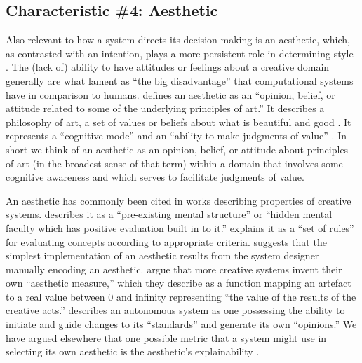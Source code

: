 \documentclass[phd,electronic,oneside,twosidetoc,letterpaper,chaptercenter,parttop,lof,lot]{byumsphd}
\begin{document}
\subsection{Characteristic \#4: Aesthetic}

Also relevant to how a system directs its decision-making is an aesthetic, which, as contrasted with an intention, plays a more persistent role in determining style \citep{Koren2010WhichDefinitions}. The (lack of) ability to have attitudes or feelings about a creative domain generally are what \citeauthor{Papadopoulos1999} \cite{Papadopoulos1999} lament as ``the big disadvantage'' that computational systems have in comparison to humans. \cite{Koren2010WhichDefinitions} defines an aesthetic as an ``opinion, belief, or attitude related to some of the underlying principles of art.'' It describes a philosophy of art, a set of values or beliefs about what is beautiful and good \citep{Mothersill2004}. It represents a ``cognitive mode'' and an ``ability to make judgments of value'' \citep{Koren2010WhichDefinitions}. In short we think of an aesthetic as an opinion, belief, or attitude about principles of art (in the broadest sense of that term) within a domain that involves some cognitive awareness and which serves to facilitate judgments of value.

An aesthetic has commonly been cited in works describing properties of creative systems. \citeauthor{Boden2003TheEdition} \cite{Boden2003TheEdition} describes it as a ``pre-existing mental structure'' or ``hidden mental faculty which has positive evaluation built in to it.'' \citeauthor{Wiggins2006ASystems} \cite{Wiggins2006ASystems} explains it as a ``set of rules'' for evaluating concepts according to appropriate criteria. \citeauthor{Ventura2017HowSystem} \cite{Ventura2017HowSystem} suggests that the simplest implementation of an aesthetic results from the system designer manually encoding an aesthetic. \citeauthor{Colton2011} \cite{Colton2011} argue that more creative systems invent their own ``aesthetic measure,'' which they describe as a function mapping an artefact to a real value between 0 and infinity representing ``the value of the results of the creative acts.'' \citeauthor{Jennings2010DevelopingIntelligence} \cite{Jennings2010DevelopingIntelligence} describes an autonomous system as one possessing the ability to initiate and guide changes to its ``standards'' and generate its own ``opinions.'' We have argued elsewhere that one possible metric that a system might use in selecting its own aesthetic is the aesthetic's explainability \citep{Bodily2018ExplainabilitySystems}.
\end{document}
